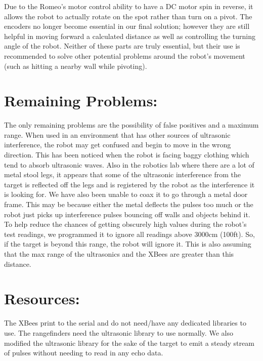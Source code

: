 \documentclass[]{article}
\begin{document}
	Due to the Romeo's motor control ability to have a DC motor spin in reverse, it allows the robot to actually rotate on the spot rather than turn on a pivot. The encoders no longer become essential in our final solution; however they are still helpful in moving forward a calculated distance as well as controlling the turning angle of the robot. Neither of these parts are truly essential, but their use is recommended to solve other potential problems around the robot's movement (such as hitting a nearby wall while pivoting). 

\section{Remaining Problems:}
	The only remaining problems are the possibility of false positives and a maximum range. When used in an environment that has other sources of ultrasonic interference, the robot may get confused and begin to move in the wrong direction. This has been noticed when the robot is facing baggy clothing which tend to absorb ultrasonic waves. Also in the robotics lab where there are a lot of metal stool legs, it appears that some of the ultrasonic interference from the target is reflected off the legs and is registered by the robot as the interference it is looking for. We have also been unable to coax it to go through a metal door frame. This may be because either the metal deflects the pulses too much or the robot just picks up interference pulses bouncing off walls and objects behind it. To help reduce the chances of getting obscurely high values during the robot's test readings, we programmed it to ignore all readings above 3000cm (100ft). So, if the target is beyond this range, the robot will ignore it. This is also assuming that the max range of the ultrasonics and the XBees are greater than this distance. 
	
\section{Resources: }
	The XBees print to the serial and do not need/have any dedicated libraries to use. The rangefinders need the ultrasonic library to use normally. We also modified the ultrasonic library for the sake of the target to emit a steady stream of pulses without needing to read in any echo data. 
\end{document}
